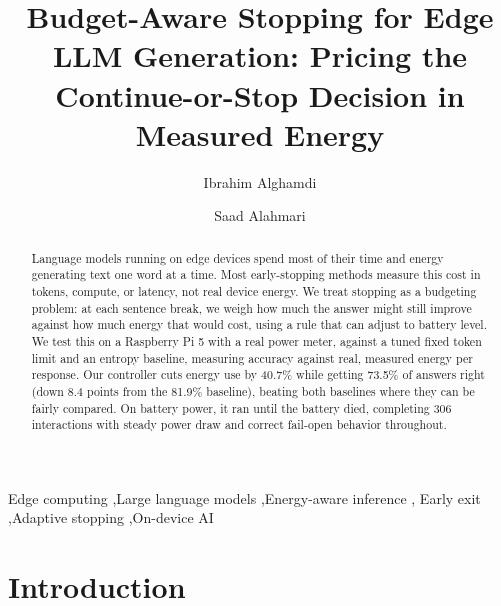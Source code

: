 \documentclass[review,12pt]{elsarticle}
\begin{document}
\begin{frontmatter}

\title{Budget-Aware Stopping for Edge LLM Generation: Pricing the Continue-or-Stop Decision in Measured Energy}

\author[inst1]{Ibrahim Alghamdi}
\address[inst1]{Computer Science Department, Faculty of Computing and Information, Al-Baha University, Al-Baha, Saudi Arabia}

\author[inst2]{Saad Alahmari}
\address[inst2]{Department of Computer Science, Applied College, Northern Border University, Arar, Saudi Arabia}

\begin{abstract}
Language models running on edge devices spend most of their time and
energy generating text one word at a time. Most early-stopping methods
measure this cost in tokens, compute, or latency, not real device
energy. We treat stopping as a budgeting problem: at each sentence
break, we weigh how much the answer might still improve against how
much energy that would cost, using a rule that can adjust to battery
level. We test this on a Raspberry Pi 5 with a real power meter,
against a tuned fixed token limit and an entropy baseline, measuring
accuracy against real, measured energy per response. Our controller
cuts energy use by 40.7\% while getting 73.5\% of answers right (down
8.4 points from the 81.9\% baseline), beating both baselines where they
can be fairly compared. On battery power, it ran until the battery
died, completing 306 interactions with steady power draw and correct
fail-open behavior throughout.
\end{abstract}

\begin{keyword}
Edge computing \sep Large language models \sep Energy-aware inference \sep
Early exit \sep Adaptive stopping \sep On-device AI
\end{keyword}

\end{frontmatter}

\linenumbers


\section{Introduction}
\label{sec:intro}
\end{document}
